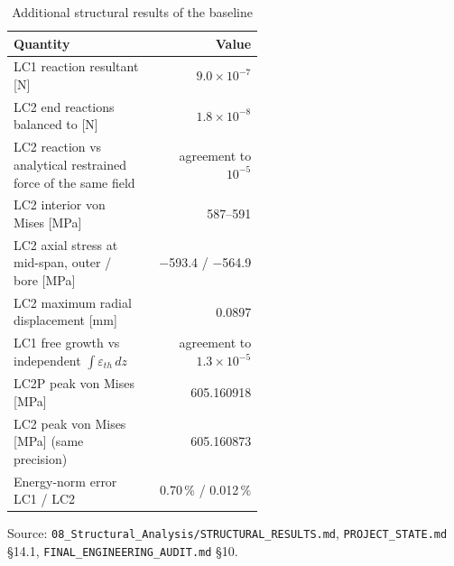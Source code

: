 \begin{table}[htbp]
\centering
\footnotesize
\caption{Additional structural results of the baseline}
\label{tab:appE}
\begin{tabular}{>{\raggedright\arraybackslash}p{0.55\linewidth}r}
\toprule
Quantity & Value \\
\midrule
LC1 reaction resultant [N] & $9.0\times10^{-7}$ \\
LC2 end reactions balanced to [N] & $1.8\times10^{-8}$ \\
LC2 reaction vs analytical restrained force of the same field & agreement to $10^{-5}$ \\
LC2 interior von Mises [MPa] & 587--591 \\
LC2 axial stress at mid-span, outer / bore [MPa] & $-$593.4 / $-$564.9 \\
LC2 maximum radial displacement [mm] & 0.0897 \\
LC1 free growth vs independent $\int\varepsilon_{th}\,dz$ & agreement to $1.3\times10^{-5}$ \\
LC2P peak von Mises [MPa] & 605.160918 \\
LC2 peak von Mises [MPa] (same precision) & 605.160873 \\
Energy-norm error LC1 / LC2 & 0.70\,\% / 0.012\,\% \\
\bottomrule
\end{tabular}
\par\smallskip\parbox{\linewidth}{\footnotesize\raggedright Source: \texttt{08\_Structural\_Analysis/STRUCTURAL\_RESULTS.md}, \texttt{PROJECT\_STATE.md} \S14.1, \texttt{FINAL\_ENGINEERING\_AUDIT.md} \S10.}
\end{table}
